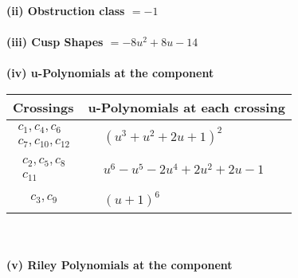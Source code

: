 \documentclass[1p]{elsarticle_modified}
\theoremstyle{definition}
\begin{document}
\flushleft \textbf{(ii) Obstruction class $= -1$}\\~\\
\flushleft \textbf{(iii) Cusp Shapes $= -8 u^2+8 u-14$}\\~\\
\newpage\renewcommand{\arraystretch}{1}
\flushleft \textbf{(iv) u-Polynomials at the component}\newline \\
\begin{tabular}{m{50pt}|m{274pt}}
Crossings & \hspace{64pt}u-Polynomials at each crossing \\
\hline $$\begin{aligned}c_{1},c_{4},c_{6}\\c_{7},c_{10},c_{12}\end{aligned}$$&$\begin{aligned}
&(u^3+u^2+2 u+1)^2
\end{aligned}$\\
\hline $$\begin{aligned}c_{2},c_{5},c_{8}\\c_{11}\end{aligned}$$&$\begin{aligned}
&u^6- u^5-2 u^4+2 u^2+2 u-1
\end{aligned}$\\
\hline $$\begin{aligned}c_{3},c_{9}\end{aligned}$$&$\begin{aligned}
&(u+1)^6
\end{aligned}$\\
\hline
\end{tabular}\\~\\
\newpage\renewcommand{\arraystretch}{1}
\flushleft \textbf{(v) Riley Polynomials at the component}\newline \\
\end{document}

